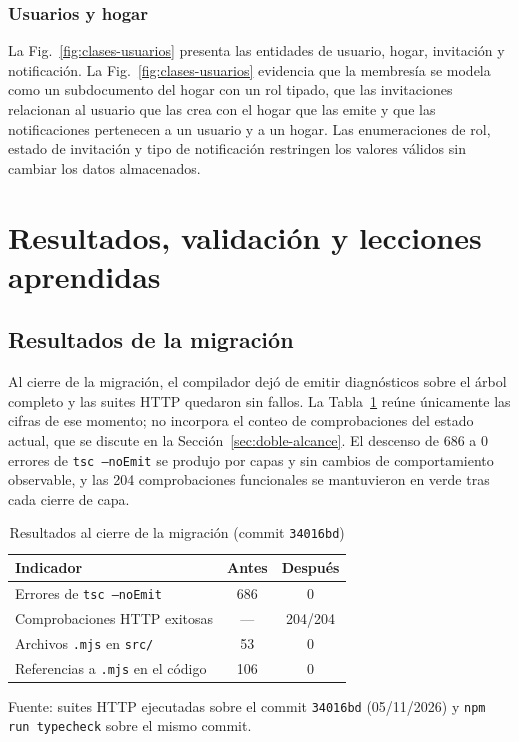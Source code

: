 \documentclass[conference]{IEEEtran}
\begin{document}
\subsubsection{Usuarios y hogar}

La Fig.~\ref{fig:clases-usuarios} presenta las entidades de usuario, hogar,
invitación y notificación. La Fig.~\ref{fig:clases-usuarios} evidencia que la
membresía se modela como un subdocumento del hogar con un rol tipado, que las
invitaciones relacionan al usuario que las crea con el hogar que las emite y
que las notificaciones pertenecen a un usuario y a un hogar. Las
enumeraciones de rol, estado de invitación y tipo de notificación restringen
los valores válidos sin cambiar los datos almacenados.

\section{Resultados, validación y lecciones aprendidas}

\subsection{Resultados de la migración}

Al cierre de la migración, el compilador dejó de emitir diagnósticos sobre el
árbol completo y las suites HTTP quedaron sin fallos. La Tabla~\ref{tab:migracion}
reúne únicamente las cifras de ese momento; no incorpora el conteo de
comprobaciones del estado actual, que se discute en la
Sección~\ref{sec:doble-alcance}. El descenso de 686 a 0 errores de
\texttt{tsc --noEmit} se produjo por capas y sin cambios de comportamiento
observable, y las 204 comprobaciones funcionales se mantuvieron en verde tras
cada cierre de capa.

\begin{table}[!t]
\caption{Resultados al cierre de la migración (commit \texttt{34016bd})}
\label{tab:migracion}
\centering
\small
\begin{tabular}{@{}lcc@{}}
\toprule
Indicador & Antes & Después \\
\midrule
Errores de \texttt{tsc --noEmit} & 686 & 0 \\
Comprobaciones HTTP exitosas & --- & 204/204 \\
Archivos \texttt{.mjs} en \texttt{src/} & 53 & 0 \\
Referencias a \texttt{.mjs} en el código & 106 & 0 \\
\bottomrule
\end{tabular}

\vspace{2pt}
{\footnotesize Fuente: suites HTTP ejecutadas sobre el commit \texttt{34016bd}
(05/11/2026) y \texttt{npm run typecheck} sobre el mismo commit.}
\end{table}
\end{document}
